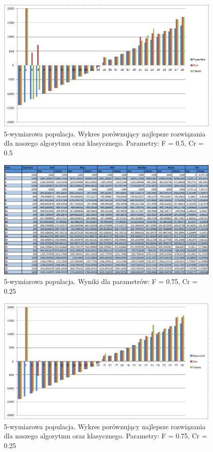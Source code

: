 \documentclass[a4paper]{article}
\begin{document}
\begin{figure}
\centering
\includegraphics[width=\textwidth]{F5Cr5L5chart.png}
\caption{5-wymiarowa populacja. Wykres porównujący najlepsze rozwiązania dla naszego algorytmu oraz klasycznego. Parametry: F = 0.5, Cr = 0.5}
\end{figure}

\begin{figure}
\centering
\includegraphics[width=\textwidth]{F75Cr25L5tab.png}
\caption{5-wymiarowa populacja. Wyniki dla parametrów: F = 0.75, Cr = 0.25}
\end{figure}

\begin{figure}
\centering
\includegraphics[width=\textwidth]{F75Cr25L5chart.png}
\caption{5-wymiarowa populacja. Wykres porównujący najlepsze rozwiązania dla naszego algorytmu oraz klasycznego. Parametry: F = 0.75, Cr = 0.25}
\end{figure}
\end{document}

